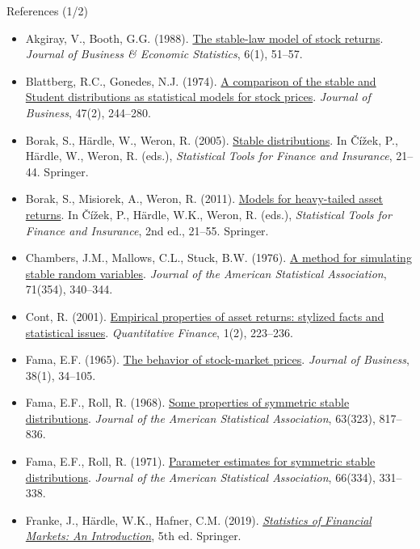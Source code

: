 \begin{frame}{References (1/2)}
\itemsize{\tiny}
\begin{itemize}
    \item Akgiray, V., Booth, G.G. (1988). \href{https://doi.org/10.1080/07350015.1988.10509636}{The stable-law model of stock returns}. \textit{Journal of Business \& Economic Statistics}, 6(1), 51--57.
    \item Blattberg, R.C., Gonedes, N.J. (1974). \href{https://doi.org/10.1086/295634}{A comparison of the stable and Student distributions as statistical models for stock prices}. \textit{Journal of Business}, 47(2), 244--280.
    \item Borak, S., Härdle, W., Weron, R. (2005). \href{https://doi.org/10.1007/3-540-27395-6_1}{Stable distributions}. In Čížek, P., Härdle, W., Weron, R. (eds.), \textit{Statistical Tools for Finance and Insurance}, 21--44. Springer.
    \item Borak, S., Misiorek, A., Weron, R. (2011). \href{https://doi.org/10.1007/978-3-642-18062-0_1}{Models for heavy-tailed asset returns}. In Čížek, P., Härdle, W.K., Weron, R. (eds.), \textit{Statistical Tools for Finance and Insurance}, 2nd ed., 21--55. Springer.
    \item Chambers, J.M., Mallows, C.L., Stuck, B.W. (1976). \href{https://doi.org/10.1080/01621459.1976.10480344}{A method for simulating stable random variables}. \textit{Journal of the American Statistical Association}, 71(354), 340--344.
    \item Cont, R. (2001). \href{https://doi.org/10.1080/713665670}{Empirical properties of asset returns: stylized facts and statistical issues}. \textit{Quantitative Finance}, 1(2), 223--236.
    \item Fama, E.F. (1965). \href{https://doi.org/10.1086/294743}{The behavior of stock-market prices}. \textit{Journal of Business}, 38(1), 34--105.
    \item Fama, E.F., Roll, R. (1968). \href{https://doi.org/10.1080/01621459.1968.11009311}{Some properties of symmetric stable distributions}. \textit{Journal of the American Statistical Association}, 63(323), 817--836.
    \item Fama, E.F., Roll, R. (1971). \href{https://doi.org/10.1080/01621459.1971.10482264}{Parameter estimates for symmetric stable distributions}. \textit{Journal of the American Statistical Association}, 66(334), 331--338.
    \item Franke, J., Härdle, W.K., Hafner, C.M. (2019). \href{https://doi.org/10.1007/978-3-030-13751-9}{\textit{Statistics of Financial Markets: An Introduction}}, 5th ed. Springer.

\end{itemize}
\end{frame}
